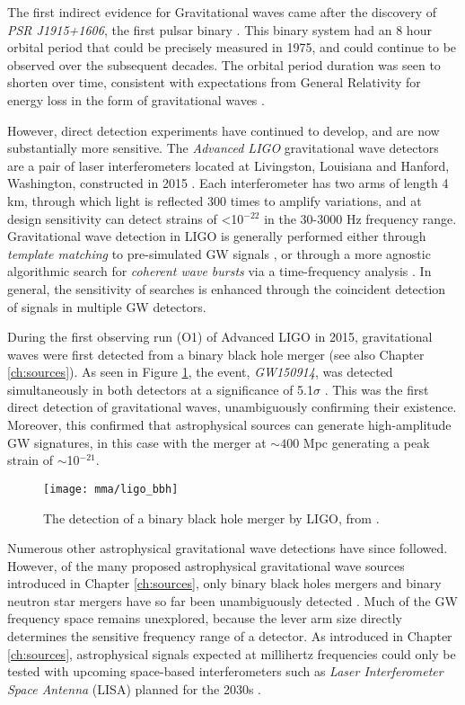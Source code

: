The first indirect evidence for Gravitational waves came after the discovery of \emph{PSR J1915+1606}, the first pulsar binary . This binary system had an 8 hour orbital period that could be precisely measured in 1975, and could continue to be observed over the subsequent decades. The orbital period duration was seen to shorten over time, consistent with expectations from General Relativity for energy loss in the form of gravitational waves . 

However, direct detection experiments have continued to develop, and are now substantially more sensitive. The \emph{Advanced LIGO} gravitational wave detectors are a pair of laser interferometers located at Livingston, Louisiana and Hanford, Washington,  constructed in 2015 . Each interferometer has two arms of length 4 km, through which light is reflected 300 times to amplify variations, and at design sensitivity can detect strains of <10$^{-22}$ in the 30-3000 Hz frequency range. Gravitational wave detection in LIGO is generally performed either through \emph{template matching} to pre-simulated GW signals , or through a more agnostic algorithmic search for \emph{coherent wave bursts} via a time-frequency analysis . In general, the sensitivity of searches is enhanced through the coincident detection of signals in multiple GW detectors.

During the first observing run (O1) of Advanced LIGO in 2015, gravitational waves were first detected from a binary black hole merger (see also Chapter \ref{ch:sources}). As seen in Figure \ref{fig:gw150914}, the event, \emph{GW150914}, was detected simultaneously in both detectors at a significance of 5.1$\sigma$  . This was the first direct detection of gravitational waves, unambiguously confirming their existence. Moreover, this confirmed that astrophysical sources can generate high-amplitude GW signatures, in this case with the merger at $\sim400$ Mpc generating a peak strain of $\sim$10$^{-21}$.

\begin{figure}[!ht]
	\centering \texttt{[image: mma/ligo\_bbh]}
	\caption{The detection of a binary black hole merger by LIGO, from \cite{ligo_bbh_16}.}
	\label{fig:gw150914}
\end{figure}

Numerous other astrophysical gravitational wave detections have since followed. However, of the many proposed astrophysical gravitational wave sources introduced in Chapter \ref{ch:sources}, only binary black holes mergers and binary neutron star mergers have so far been unambiguously detected .  Much of the GW frequency space remains unexplored, because the lever arm size directly determines the sensitive frequency range of a detector. As introduced in Chapter \ref{ch:sources}, astrophysical signals expected at millihertz frequencies could only be tested with upcoming space-based interferometers such as \emph{Laser Interferometer Space Antenna} (LISA) planned for the 2030s .


